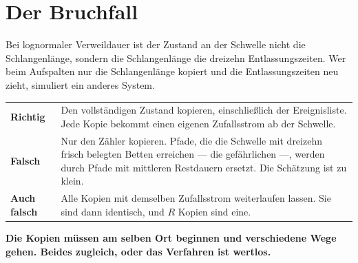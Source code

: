 \section{Der Bruchfall}

\begin{warnung}
Bei lognormaler Verweildauer ist der Zustand an der Schwelle nicht die Schlangenlänge, sondern die Schlangenlänge  die dreizehn Entlassungszeiten. Wer beim Aufspalten nur die Schlangenlänge kopiert und die Entlassungszeiten neu zieht, simuliert ein anderes System.

\begin{center}
{\small
\renewcommand{\arraystretch}{1.5}
\begin{tabular}{@{}P{2.8cm}P{5.8cm}@{}}
\toprule
\textbf{Richtig} & Den vollständigen Zustand kopieren, einschließlich der Ereignisliste. Jede Kopie bekommt einen eigenen Zufallsstrom ab der Schwelle.\\
\textbf{Falsch} & Nur den Zähler kopieren. Pfade, die die Schwelle mit dreizehn frisch belegten Betten erreichen --- die gefährlichen ---, werden durch Pfade mit mittleren Restdauern ersetzt. Die Schätzung ist zu klein.\\
\textbf{Auch falsch} & Alle Kopien mit demselben Zufallsstrom weiterlaufen lassen. Sie sind dann identisch, und $R$ Kopien sind eine.\\
\bottomrule
\end{tabular}}
\end{center}

\begin{center}
\begin{minipage}{0.9\textwidth}
\textbf{Die Kopien müssen am selben Ort beginnen und verschiedene Wege gehen. Beides zugleich, oder das Verfahren ist wertlos.}
\end{minipage}
\end{center}

\begin{center}
\begin{minipage}{0.88\textwidth}
\end{minipage}
\end{center}
\end{warnung}

